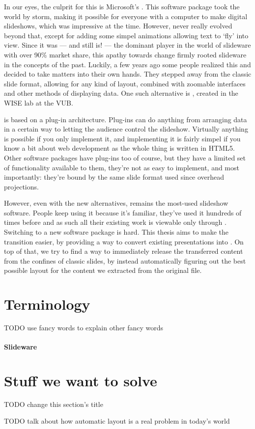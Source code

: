   In our eyes, the culprit for this is Microsoft's \ppt. This software package
  took the world by storm, making it possible for everyone with a computer to
  make digital slideshows, which was impressive at the time. However, \ppt*
  never really evolved beyond that, except for adding some simpel animations
  allowing text to `fly' into view. Since it was --- and still is! --- the
  dominant player in the world of slideware with over 90\% market share, this
  apathy towards change firmly rooted slideware in the concepts of the past.
  Luckily, a few years ago some people realized this and decided to take
  matters into their own hands. They stepped away from the classic slide
  format, allowing for any kind of layout, combined with zoomable interfaces
  and other methods of displaying data. One such alternative is \mxp, created
  in the WISE lab at the VUB.

  \mxp is based on a plug-in architecture. Plug-ins can do anything from
  arranging data in a certain way to letting the audience control the
  slideshow. Virtually anything is possible if you only implement it, and
  implementing it is fairly simpel if you know a bit about web development as
  the whole thing is written in HTML5. Other software packages have plug-ins
  too of course, but they have a limited set of functionality available to
  them, they're not as easy to implement, and most importantly: they're bound
  by the same slide format used since overhead projections.

  However, even with the new alternatives, \ppt* remains the most-used slideshow
  software. People keep using it because it's familiar, they've used it
  hundreds of times before and as such all their existing work is viewable only
  through \ppt. Switching to a new software package is hard. This thesis aims
  to make the transition easier, by providing a way to convert existing \ppt
  presentations into \mxp. On top of that, we try to find a way to immediately
  release the transferred content from the confines of classic slides, by
  instead automatically figuring out the best possible layout for the content
  we extracted from the original \ppt file.

  \section{Terminology}

   TODO use fancy words to explain other fancy words

   \paragraph{Slideware}

  \section{Stuff we want to solve}

   TODO change this section's title

   TODO talk about how automatic layout is a real problem in today's world

